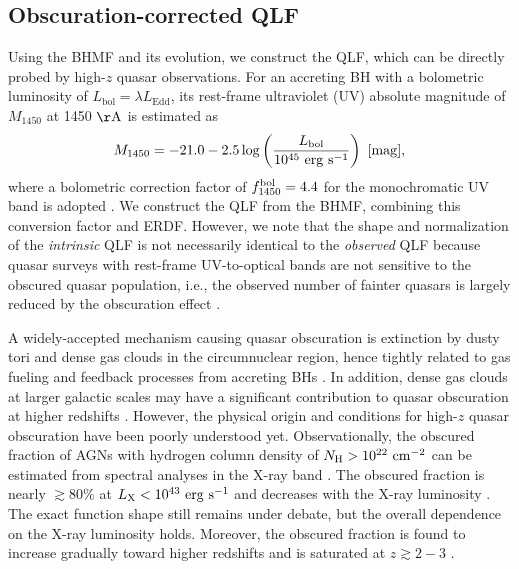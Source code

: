 \documentclass[twocolumn, twocolappendix]{aastex63}
\newcommand{\Muv}{M_{1450}}
\newcommand{\Lbol}{L_\mathrm{bol}}
\begin{document}
\begin{CJK*}{UTF8}{gbsn}
\vspace{2mm}
\subsection{Obscuration-corrected QLF}\label{sec:LF}

Using the BHMF and its evolution, we construct the QLF, which can be directly probed by high-$z$ quasar observations.
For an accreting BH with a bolometric luminosity of $\Lbol=\lambda L_\mathrm{Edd}$, 
its rest-frame ultraviolet (UV) absolute magnitude of $\Muv$ at 1450 $\mathrm{\AA}$ is estimated as
%
\begin{equation}
  \label{eq:M1450}
  \Muv= -21.0-2.5 \log  \left(\frac{\Lbol}{10^{45}~\mathrm{erg~s}^{-1}} \right) ~[\rm{mag}],
\end{equation}
%
where a bolometric correction factor of $f^{\rm bol}_{1450}=4.4$ for the monochromatic UV band is adopted
\citep{2006ApJS..166..470R}.
We construct the QLF from the BHMF, combining this conversion factor and ERDF.
However, we note that the shape and normalization of the {\it intrinsic} QLF is not necessarily identical to the {\it observed} QLF
because quasar surveys with rest-frame UV-to-optical bands are not sensitive to the obscured quasar population,
i.e., the observed number of fainter quasars is largely reduced by the obscuration effect
\citep{2003ApJ...598..886U,2007A&A...463...79G,2008A&A...490..905H,2014ApJ...786..104U,2014MNRAS.437.3550M}. 


A widely-accepted mechanism causing quasar obscuration is extinction by dusty tori and dense gas clouds 
in the circumnuclear region, hence tightly related to gas fueling and feedback processes from accreting BHs 
\citep[see][for a review]{2018ARA&A..56..625H}.
In addition, dense gas clouds at larger galactic scales may have a significant contribution to quasar obscuration at 
higher redshifts \citep{2020MNRAS.495.2135N}.
However, the physical origin and conditions for high-$z$ quasar obscuration have been poorly understood yet.
Observationally, the obscured fraction of AGNs with hydrogen column density of $N_{\rm H}>10^{22}~{\rm cm}^{-2}$
can be estimated from spectral analyses in the X-ray band
\citep[e.g.,][]{2003ApJ...598..886U,2007A&A...463...79G,2008A&A...490..905H}. 
The obscured fraction is nearly $\gtrsim 80\%$ at $L_{\rm X}<10^{43}~{\rm erg~s}^{-1}$ and 
decreases with the X-ray luminosity \citep{2014ApJ...786..104U,2014MNRAS.437.3550M}.
The exact function shape still remains under debate, but the overall dependence on the X-ray luminosity holds.
Moreover, the obscured fraction is found to increase gradually toward higher redshifts and is saturated at $z\gtrsim 2-3$
\citep{2008A&A...490..905H,2014ApJ...786..104U,2014MNRAS.437.3550M,2018MNRAS.473.2378V,2022arXiv220603508G}.



\end{CJK*}
\end{document}
